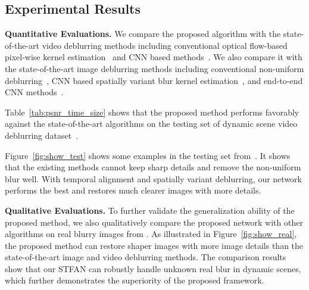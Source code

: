 \documentclass[10pt,twocolumn,letterpaper]{article}
\begin{document}
\subsection{Experimental Results}
\noindent\textbf{Quantitative Evaluations.} We compare the proposed algorithm with the state-of-the-art video deblurring methods including conventional optical flow-based pixel-wise kernel estimation~\cite{hyun2015generalized} and CNN based methods~\cite{su2017deep,hyun2017online}.
We also compare it with the state-of-the-art image deblurring methods including conventional non-uniform deblurring~\cite{whyte2012non}, CNN based spatially variant blur kernel estimation~\cite{sun2015learning, gong2017motion}, and end-to-end CNN methods~\cite{nah2017deep, kupyn2018deblurgan, zhang2018dynamic, tao2018scale}.

Table~\ref{tab:psnr_time_size} shows that the proposed method performs favorably against the state-of-the-art algorithms on the testing set of dynamic scene video deblurring dataset~\cite{su2017deep}.


Figure~\ref{fig:show_test} shows some examples in the testing set from~\cite{su2017deep}.
It shows that the existing methods cannot keep sharp details and remove the non-uniform blur well.
With temporal alignment and spatially variant deblurring, our network performs the best and restores much clearer images with more details.


\noindent\textbf{Qualitative Evaluations.}
To further validate the generalization ability of the proposed method,
we also qualitatively compare the proposed network with other algorithms on real blurry images from \cite{su2017deep}.
As illustrated in Figure~\ref{fig:show_real}, the proposed method can restore shaper images with more image details than the state-of-the-art image and video deblurring methods.
The comparison results show that our STFAN can robustly handle unknown real blur in dynamic scenes, which further demonstrates the superiority of the proposed framework.
\end{document}
